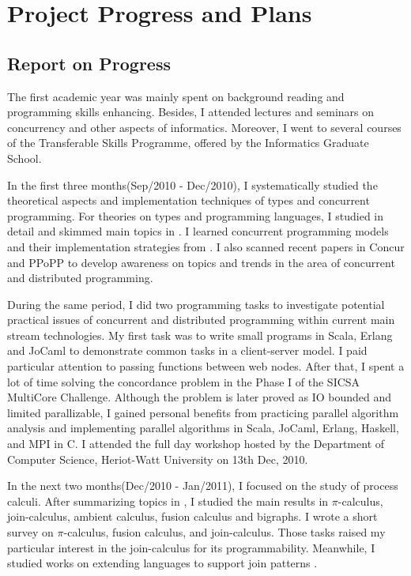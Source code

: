 \section{Project Progress and Plans}

\subsection{Report on Progress}

The first academic year was mainly spent on background reading and programming skills enhancing.  Besides, I attended lectures and seminars on concurrency and other aspects of informatics.  Moreover, I went to several courses of the Transferable Skills Programme, offered by the Informatics Graduate School.

In the first three months(Sep/2010 - Dec/2010), I systematically studied the theoretical aspects and implementation techniques of types and concurrent programming.   For theories on types and programming languages, I studied \cite{TPL} in detail and skimmed main topics in \cite{ATTAPL}.  I learned concurrent programming models and their implementation strategies from \cite{roy}.  I also scanned recent papers in Concur and PPoPP to develop awareness on topics and trends in the area of concurrent and distributed programming.

During the same period, I did two programming tasks to investigate potential practical issues of concurrent and distributed programming within current main stream technologies.  My first task was to write small programs in Scala, Erlang and JoCaml to demonstrate common tasks in a client-server model.  I paid particular attention to passing functions between web nodes.  After that, I spent a lot of time solving the concordance problem in the Phase I of the SICSA MultiCore Challenge\cite{MultiCore}.  Although the problem is later proved as IO bounded and limited parallizable, I gained personal benefits from practicing parallel algorithm analysis and implementing parallel algorithms in Scala, JoCaml, Erlang, Haskell, and MPI in C.  I attended the full day workshop hosted by the Department of Computer Science, Heriot-Watt University on 13th Dec, 2010.

In the next two months(Dec/2010 - Jan/2011), I focused on the study of process calculi.  After summarizing topics in \cite{25year}, I studied the main results in $\pi$-calculus\cite{pi_paper, pi_book}, join-calculus\cite{RCHAM, jocaml_lan}, ambient calculus\cite{MobileAmbients, TypeMobileAmbients}, fusion calculus\cite{fusion} and bigraphs\cite{bigraph_book}.  I wrote a short survey on $\pi$-calculus, fusion calculus, and join-calculus.  Those tasks raised my particular interest in the join-calculus for its programmability.  Meanwhile, I studied works on extending languages to support join patterns \cite{join_csharp, scala_joins, join-fsharp}. 

